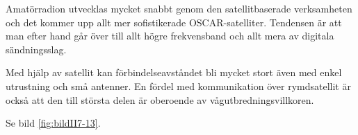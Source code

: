 Amatörradion utvecklas mycket snabbt genom den satellitbaserade
verksamheten och det kommer upp allt mer sofistikerade OSCAR-satelliter.
Tendensen är att man efter hand går över till allt
högre frekvensband och allt mera av digitala sändningsslag.

Med hjälp av satellit kan förbindelseavståndet bli mycket stort även
med enkel utrustning och små antenner.
En fördel med kommunikation över rymdsatellit är också att den till största
delen är oberoende av vågutbredningsvillkoren.

Se bild \ref{fig:bildII7-13}.
